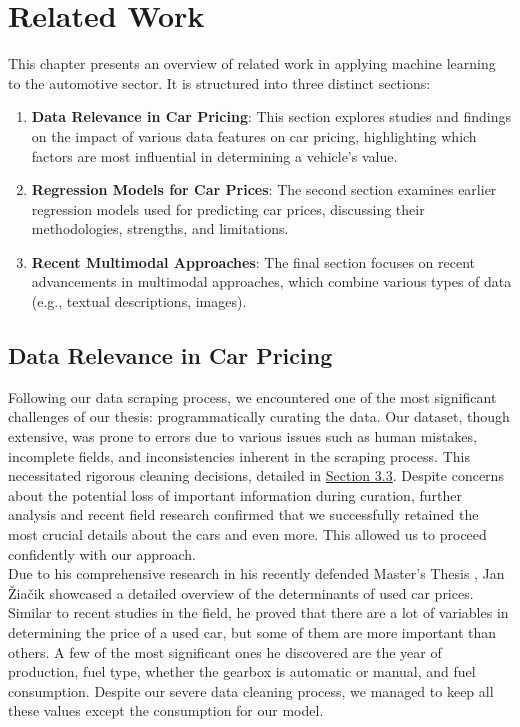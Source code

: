 \chapter{Related Work}

This chapter presents an overview of related work in applying machine learning to the automotive sector. It is structured into three distinct sections:

\begin{enumerate}
    \item \textbf{Data Relevance in Car Pricing}: This section explores studies and findings on the impact of various data features on car pricing, highlighting which factors are most influential in determining a vehicle's value.
    \item \textbf{Regression Models for Car Prices}: The second section examines earlier regression models used for predicting car prices, discussing their methodologies, strengths, and limitations.
    \item \textbf{Recent Multimodal Approaches}: The final section focuses on recent advancements in multimodal approaches, which combine various types of data (e.g., textual descriptions, images).
\end{enumerate}

\section{Data Relevance in Car Pricing}
Following our data scraping process, we encountered one of the most significant challenges of our thesis: programmatically curating the data. Our dataset, though extensive, was prone to errors due to various issues such as human mistakes, incomplete fields, and inconsistencies inherent in the scraping process. This necessitated rigorous cleaning decisions, detailed in \hyperref[sec:data-cleaning]{Section 3.3}. Despite concerns about the potential loss of important information during curation, further analysis and recent field research confirmed that we successfully retained the most crucial details about the cars and even more. This allowed us to proceed confidently with our approach.
\\

Due to his comprehensive research in his recently defended Master's Thesis \cite{czech}, Jan Žiačik showcased a detailed overview of the determinants of used car prices. Similar to recent studies in the field, he proved that there are a lot of variables in determining the price of a used car, but some of them are more important than others. A few of the most significant ones he discovered are the year of production, fuel type, whether the gearbox is automatic or manual, and fuel consumption. Despite our severe data cleaning process, we managed to keep all these values except the consumption for our model.

